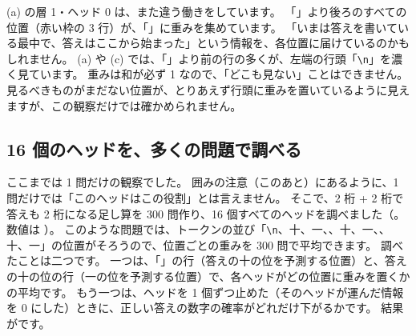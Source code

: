 (a) の層 1・ヘッド 0 は、また違う働きをしています。
「\code{=}」より後ろのすべての位置（赤い枠の 3 行）が、「\code{=}」に重みを集めています。
「いまは答えを書いている最中で、答えはここから始まった」という情報を、各位置に届けているのかもしれません。
(a) や (c) では、「\code{=}」より前の行の多くが、左端の行頭「\texttt{\textbackslash n}」を濃く見ています。
重みは和が必ず 1 なので、「どこも見ない」ことはできません。
見るべきものがまだない位置が、とりあえず行頭に重みを置いているように見えますが、この観察だけでは確かめられません。

\subsection*{16 個のヘッドを、多くの問題で調べる}

ここまでは 1 問だけの観察でした。
囲みの注意（このあと）にあるように、1 問だけでは「このヘッドはこの役割」とは言えません。
そこで、2 桁 + 2 桁で答えも 2 桁になる足し算を 300 問作り、16 個すべてのヘッドを調べました（。数値は ）。
このような問題では、トークンの並び「\texttt{\textbackslash n}、十、一、\code{+}、十、一、\code{=}、十、一」の位置がそろうので、位置ごとの重みを 300 問で平均できます。
調べたことは二つです。
一つは、「\code{=}」の行（答えの十の位を予測する位置）と、答えの十の位の行（一の位を予測する位置）で、各ヘッドがどの位置に重みを置くかの平均です。
もう一つは、ヘッドを 1 個ずつ止めた（そのヘッドが運んだ情報を 0 にした）ときに、正しい答えの数字の確率がどれだけ下がるかです。
結果がです。

